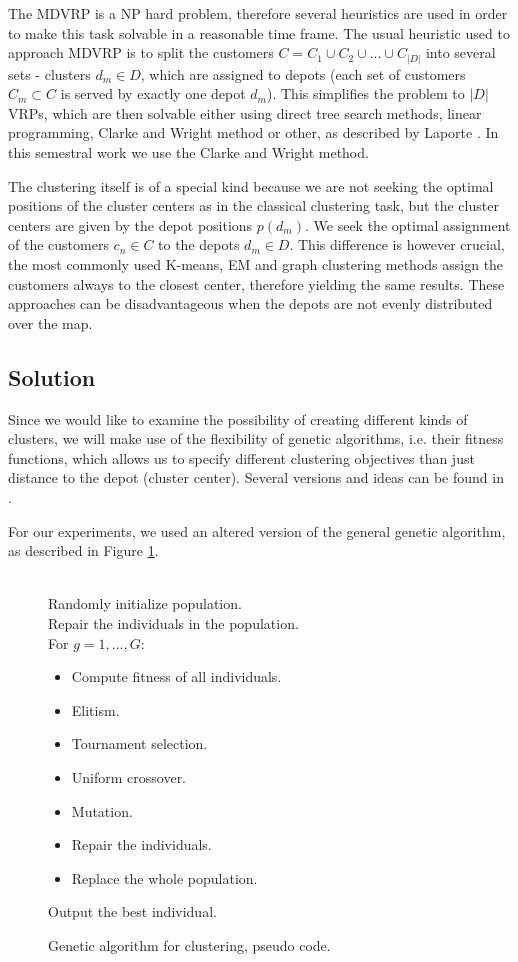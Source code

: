 \documentclass[conference]{IEEEtran}
\begin{document}
The MDVRP is a NP hard problem, therefore several heuristics are used in order to make this task solvable in a reasonable time frame. The usual heuristic used to approach MDVRP is to split the customers $C = C_1 \cup C_2 \cup ... \cup C_{|D|}$ into several sets - clusters $d_m \in D$, which are assigned to depots (each set of customers $C_m \subset C$ is served by exactly one depot $d_m$). This simplifies the problem to $|D|$ VRPs, which are then solvable either using direct tree search methods, linear programming, Clarke and Wright \cite{clarke1964scheduling} method or other, as described by Laporte \cite{laporte1992vehicle}. In this semestral work we use the Clarke and Wright method.

The clustering itself is of a special kind because we are not seeking the optimal positions of the cluster centers as in the classical clustering task, but the cluster centers are given by the depot positions $p(d_m)$. We seek the optimal assignment of the customers $c_n \in C$ to the depots $d_m \in D$. This difference is however crucial, the most commonly used K-means, EM and graph clustering methods \cite{alldrin2003clustering} assign the customers always to the closest center, therefore yielding the same results. These approaches can be disadvantageous when the depots are not evenly distributed over the map.


\subsection{Solution} %
\label{sub:solution}
Since we would like to examine the possibility of creating different kinds of clusters, we will make use of the flexibility of genetic algorithms, i.e. their fitness functions, which allows us to specify different clustering objectives than just distance to the depot (cluster center). Several versions and ideas can be found in \cite{pelikan2000genetic,murthy1996search}.

For our experiments, we used an altered version of the general genetic algorithm, as described in Figure \ref{gapscd}.
\begin{figure}[b]
    \hrulefill\\
  Randomly initialize population. \\
  Repair the individuals in the population.\\
  For $g = 1,...,G$: 
  \begin{itemize}
    \item Compute fitness of all individuals.
    \item Elitism.
    \item Tournament selection.
    \item Uniform crossover.
    \item Mutation.
    \item Repair the individuals.
    \item Replace the whole population.
  \end{itemize}
  Output the best individual.

  \hrulefill
    \caption{Genetic algorithm for clustering, pseudo code.}
    \label{gapscd}
\end{figure}
\end{document}
